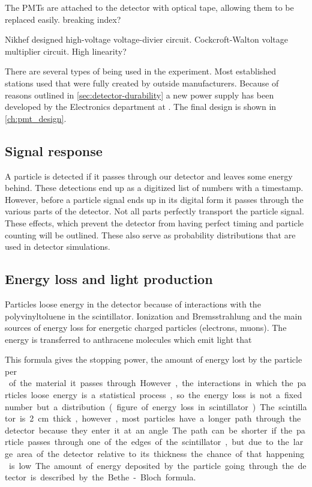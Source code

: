 The PMTs are attached to the detector with optical tape, allowing them to be replaced easily. breaking index?

Nikhef designed high-voltage voltage-divier circuit.
Cockcroft-Walton voltage multiplier circuit.
High linearity?

There are several types of \pmt being used in the \hisparc experiment. Most established stations used \pmts that were fully created by outside manufacturers. Because of reasons outlined in \cref{sec:detector-durability} a new \pmt power supply has been developed by the Electronics department at \nikhef. The final design is shown in \cref{ch:pmt_design}.



\subsection{Signal response}

A particle is detected if it passes through our detector and leaves some energy behind. These detections end up as a digitized list of numbers with a timestamp. However, before a particle signal ends up in its digital form it passes through the various parts of the detector. Not all parts perfectly transport the particle signal. These effects, which prevent the detector from having perfect timing and particle counting will be outlined. These also serve as probability distributions that are used in detector simulations.


\subsection{Energy loss and light production}

Particles loose energy in the detector because of interactions with the polyvinyltoluene in the scintillator. Ionization and Bremsstrahlung and the main sources of energy loss for energetic charged particles (electrons, muons). The energy is transferred to anthracene molecules which emit light that

This formula gives the stopping power, the amount of energy lost by the particle per \si{\gram\centi\meter\square} of the material it passes through. However, the interactions in which the particles loose energy is a statistical process, so the energy loss is not a fixed number but a distribution.

(figure of energy loss in scintillator)

The scintillator is \SI{2}{\centi\meter} thick, however, most particles have a longer path through the detector because they enter it at an angle. The path can be shorter if the particle passes through one of the edges of the scintillator, but due to the large area of the detector relative to its thickness the chance of that happening is low. The amount of energy deposited by the particle going through the detector is described by the Bethe-Bloch formula.



